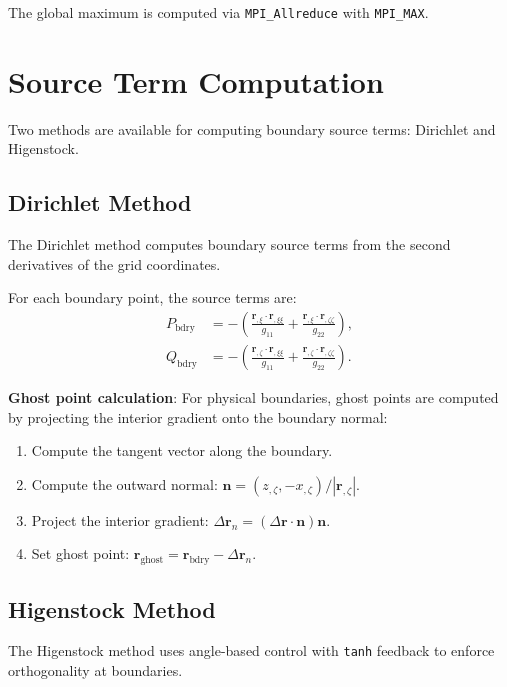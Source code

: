 \documentclass[11pt,a4paper]{report}
\newcommand{\rvec}{\bm{r}}
\newcommand{\nvec}{\bm{n}}
\begin{document}
The global maximum is computed via \texttt{MPI\_Allreduce} with \texttt{MPI\_MAX}.

\section{Source Term Computation}

Two methods are available for computing boundary source terms: Dirichlet and Higenstock.

\subsection{Dirichlet Method}

The Dirichlet method computes boundary source terms from the second derivatives of the grid coordinates.

For each boundary point, the source terms are:
\begin{equation}
\begin{aligned}
    P_{\text{bdry}} &= -\left( \frac{\rvec_{,\xi} \cdot \rvec_{,\xi\xi}}{g_{11}} + \frac{\rvec_{,\xi} \cdot \rvec_{,\zeta\zeta}}{g_{22}} \right), \\
    Q_{\text{bdry}} &= -\left( \frac{\rvec_{,\zeta} \cdot \rvec_{,\xi\xi}}{g_{11}} + \frac{\rvec_{,\zeta} \cdot \rvec_{,\zeta\zeta}}{g_{22}} \right).
\end{aligned}
\end{equation}

\textbf{Ghost point calculation}: For physical boundaries, ghost points are computed by projecting the interior gradient onto the boundary normal:
\begin{enumerate}
    \item Compute the tangent vector along the boundary.
    \item Compute the outward normal: $\nvec = (z_{,\zeta}, -x_{,\zeta}) / |\rvec_{,\zeta}|$.
    \item Project the interior gradient: $\Delta \rvec_n = (\Delta \rvec \cdot \nvec) \nvec$.
    \item Set ghost point: $\rvec_{\text{ghost}} = \rvec_{\text{bdry}} - \Delta \rvec_n$.
\end{enumerate}

\subsection{Higenstock Method}

The Higenstock method uses angle-based control with \texttt{tanh} feedback to enforce orthogonality at boundaries.
\end{document}
